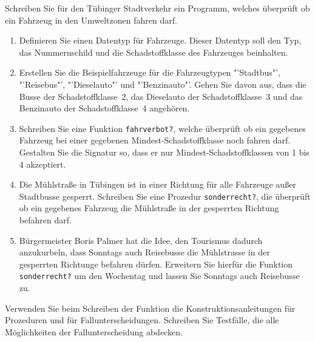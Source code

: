 \begin{aufgabe}

  Schreiben Sie für den Tübinger Stadtverkehr ein
  Programm, welches überprüft ob ein Fahrzeug in den Umweltzonen fahren 
  darf.
  \begin{enumerate}
  \item Definieren Sie einen Datentyp für Fahrzeuge. Dieser
    Datentyp soll den Typ, das Nummernschild und die Schadstoffklasse des
    Fahrzeuges beinhalten.
  \item Erstellen Sie die Beispielfahrzeuge für die
    Fahrzeugtypen "'Stadtbus"', "'Reisebus"', "'Dieselauto"'
    und "'Benzinauto"'. Gehen Sie davon aus, dass die Busse der
    Schadstoffklasse~2, das Dieselauto der Schadstoffklasse~3 und das
    Benzinauto der Schadstoffklasse~4 angehören.
  \item Schreiben Sie eine Funktion \texttt{fahrverbot?},
    welche überprüft ob ein gegebenes Fahrzeug bei einer gegebenen
    Mindest-Schadstoffklasse noch fahren darf. Gestalten Sie die Signatur
    so, dass er nur Mindest-Schadstoffklassen von 1 bis 4 akzeptiert.
  \item Die Mühlstraße in Tübingen ist in einer Richtung für
    alle Fahrzeuge außer Stadtbusse gesperrt. Schreiben Sie eine Prozedur
    \texttt{sonderrecht?}, die überprüft ob ein gegebenes Fahrzeug die
    Mühlstraße in der gesperrten Richtung befahren darf.  
  \item Bürgermeister Boris Palmer hat die Idee, den Tourismus
    dadurch anzukurbeln, dass Sonntags auch Reisebusse die Mühlstrasse in
    der gesperrten Richtunge befahren dürfen. Erweitern Sie hierfür die
    Funktion \texttt{sonderrecht?} um den Wochentag und lassen Sie Sonntags
    auch Reisebusse zu.
  \end{enumerate}
  Verwenden Sie beim Schreiben der Funktion die
  Konstruktionsanleitungen für Prozeduren und für Fallunterscheidungen. 
  Schreiben Sie Testfälle, die alle Möglichkeiten der   
  Fallunterscheidung abdecken.
  
\end{aufgabe}

